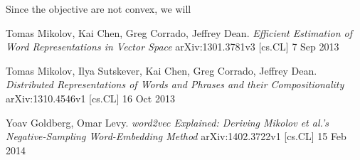 \documentclass[]{article}
\begin{document}
\noindent Since the objective are not convex, we will 

\begin{thebibliography}{1}
 Tomas Mikolov, Kai Chen, Greg Corrado, Jeffrey Dean. {\em Efficient Estimation of Word Representations in Vector Space} arXiv:1301.3781v3 [cs.CL] 7 Sep 2013

 Tomas Mikolov, Ilya Sutskever, Kai Chen, Greg Corrado, Jeffrey Dean. {\em Distributed Representations of Words and Phrases and their Compositionality} arXiv:1310.4546v1  [cs.CL]  16 Oct 2013

 Yoav Goldberg, Omar Levy. {\em word2vec Explained: Deriving Mikolov et al.'s Negative-Sampling Word-Embedding Method} arXiv:1402.3722v1  [cs.CL]  15 Feb 2014

\end{thebibliography}
\end{document}

